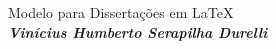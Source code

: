 
\ \vfill
\begin{center}
\begin{minipage}[c]{12cm}
\begin{center}
\hrulefill\\
\vspace{.5cm} {\Large\sf Modelo para Dissertações em \LaTeX}\\
\vspace{1.3cm}
\textbf{\large\textit{Vin\'icius Humberto Serapilha Durelli}}\\
\vspace{.5cm}
\hrulefill\\
\end{center}
\end{minipage}
\end{center}
\vfill

\cleardoublepage

